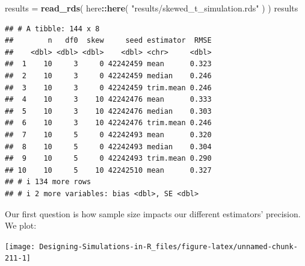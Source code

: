 \documentclass[
]{book}
\newenvironment{Shaded}{\begin{snugshade}}{\end{snugshade}}
\newcommand{\AttributeTok}[1]{\textcolor[rgb]{0.13,0.29,0.53}{#1}}
\newcommand{\FunctionTok}[1]{\textcolor[rgb]{0.13,0.29,0.53}{\textbf{#1}}}
\newcommand{\NormalTok}[1]{#1}
\newcommand{\OtherTok}[1]{\textcolor[rgb]{0.56,0.35,0.01}{#1}}
\newcommand{\SpecialCharTok}[1]{\textcolor[rgb]{0.81,0.36,0.00}{\textbf{#1}}}
\newcommand{\StringTok}[1]{\textcolor[rgb]{0.31,0.60,0.02}{#1}}
\begin{document}
\begin{Shaded}
\begin{Highlighting}[]
\NormalTok{results }\OtherTok{=} \FunctionTok{read\_rds}\NormalTok{( here}\SpecialCharTok{::}\FunctionTok{here}\NormalTok{( }\StringTok{"results/skewed\_t\_simulation.rds"}\NormalTok{ ) )}
\NormalTok{results}
\end{Highlighting}
\end{Shaded}

\begin{verbatim}
## # A tibble: 144 x 8
##        n   df0  skew     seed estimator  RMSE
##    <dbl> <dbl> <dbl>    <dbl> <chr>     <dbl>
##  1    10     3     0 42242459 mean      0.323
##  2    10     3     0 42242459 median    0.246
##  3    10     3     0 42242459 trim.mean 0.246
##  4    10     3    10 42242476 mean      0.333
##  5    10     3    10 42242476 median    0.303
##  6    10     3    10 42242476 trim.mean 0.246
##  7    10     5     0 42242493 mean      0.320
##  8    10     5     0 42242493 median    0.304
##  9    10     5     0 42242493 trim.mean 0.290
## 10    10     5    10 42242510 mean      0.327
## # i 134 more rows
## # i 2 more variables: bias <dbl>, SE <dbl>
\end{verbatim}

Our first question is how sample size impacts our different estimators' precision.
We plot:

\begin{Shaded}
\end{Shaded}

\begin{center}\texttt{[image: Designing-Simulations-in-R\_files/figure-latex/unnamed-chunk-211-1]} \end{center}
\end{document}
